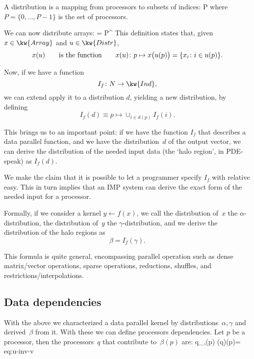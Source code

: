 A distribution is a mapping from processors to subsets of indices:
%
    {\equiv P \rightarrow {}}
%
where $P=\{0,\ldots,P-1\}$ is the set of processors.

We can now distribute arrays:
%
    { \equiv {}\circ{} = P^{}}
%
This definition states that, given $x\in\kw{Array}$ and $u\in\kw{Distr}$,
\[ x(u) \qquad\hbox{is the function}\qquad
   x(u) \colon p\mapsto x\bigl(u(p)\bigr) = \{ x_i\colon i\in u(p) \}.
\]

Now, if we have a function
\[ I_f \colon N\rightarrow \kw{Ind}, \]
we can extend apply it to a distribution $d$, yielding a new distribution,
by defining
\[ I_f(d) \equiv p\mapsto \cup_{i\in d(p)} I_f(i). \]

This brings us to an important point: if we have the function $I_f$
that describes a data parallel function, and we have the distribution~$d$
of the output vector, we can derive the distribution of the needed input data
(the `halo region', in PDE-speak) as $I_f(d)$.

We make the claim that it is possible to let a programmer
specify $I_f$ with relative easy. This in turn implies that an \ac{IMP}
system can derive the exact form of the needed input for a processor.

Formally, if we consider a kernel $y\leftarrow f(x)$, we call
the distribution of~$x$ the $\alpha$-distribution, the distribution
of~$y$ the $\gamma$-distribution, and we derive the distribution
of the halo regions as
\[ \beta=I_f(\gamma). \]

This formula is quite general, encompassing parallel operation
such as dense matrix/vector operations, sparse operations, reductions,
shuffles, and restrictions/interpolations.

\subsection{Data dependencies}
\label{sec:u-inv-v}

With the above we characterized a data parallel kernel
by distributions~$\alpha,\gamma$ and derived~$\beta$ from it.
With these we can define processors dependencies.
Let $p$ be a processor, then
the processors~$q$ that contribute to~$\beta(p)$ are:
%
{q\in {}_{\alpha,\beta}(p) \equiv \alpha(q)\cap \beta(p)\not=\emptyset}
{eq:u-inv-v}

